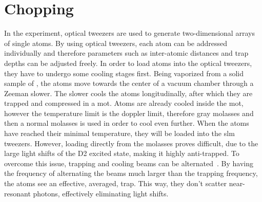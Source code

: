 \chapter{Chopping}%
\label{ch:chopping}


In the experiment, optical tweezers are used to generate two-dimensional arrays of single atoms. By using optical tweezers, each atom can be addressed individually and therefore parameters such as inter-atomic distances and trap depths can be adjusted freely. In order to load atoms into the optical tweezers, they have to undergo some cooling stages first. Being vaporized from a solid sample of , the atoms move towards the center of a vacuum chamber through a Zeeman slower. The slower cools the atoms longitudinally, after which they are trapped and compressed in a \ac{mot}. Atoms are already cooled inside the \ac{mot}, however the temperature limit is the doppler limit, therefore gray molasses and then a normal molasses is used in order to cool even further. When the atoms have reached their minimal temperature, they will be loaded into the \ac{slm} tweezers. However, loading directly from the molasses proves difficult, due to the large light shifts of the D2 excited state, making it highly anti-trapped. To overcome this issue, trapping and cooling beams can be alternated~\cite{Hutzler2017}. By having the frequency of alternating the beams much larger than the trapping frequency, the atoms see an effective, averaged, trap. This way, they don't scatter near-resonant photons, effectively eliminating light shifts.

